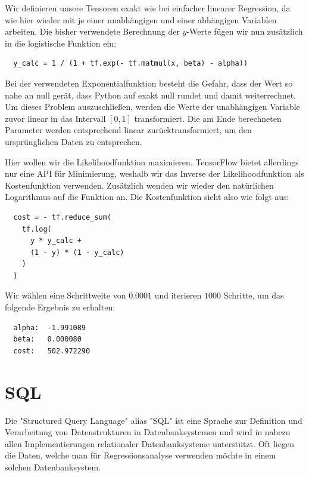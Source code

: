 Wir definieren unsere Tensoren exakt wie bei einfacher linearer Regression, da wie hier wieder mit je einer unabhängigen und einer abhängigen Variablen arbeiten. Die bisher verwendete Berechnung der $y$-Werte fügen wir nun zusätzlich in die logistische Funktion ein:

\begin{verbatim}
  y_calc = 1 / (1 + tf.exp(- tf.matmul(x, beta) - alpha))
\end{verbatim}

Bei der verwendeten Exponentialfunktion besteht die Gefahr, dass der Wert so nahe an null gerät, dass Python auf exakt null rundet und damit weiterrechnet. Um dieses Problem auszuschließen, werden die Werte der unabhängigen Variable zuvor linear in das Intervall $[0, 1]$ transformiert. Die am Ende berechneten Parameter werden entsprechend linear zurücktransformiert, um den ursprünglichen Daten zu entsprechen.

Hier wollen wir die Likelihoodfunktion maximieren. TensorFlow bietet allerdings nur eine API für Minimierung, weshalb wir das Inverse der Likelihoodfunktion als Kostenfunktion verwenden. Zusätzlich wenden wir wieder den natürlichen Logarithmus auf die Funktion an. Die Kostenfunktion sieht also wie folgt aus:

\begin{verbatim}
  cost = - tf.reduce_sum(
    tf.log(
      y * y_calc +
      (1 - y) * (1 - y_calc)
    )
  )
\end{verbatim}

Wir wählen eine Schrittweite von $0.0001$ und iterieren $1000$ Schritte, um das folgende Ergebnis zu erhalten:

\begin{verbatim}
  alpha:  -1.991089
  beta:   0.000080
  cost:   502.972290
\end{verbatim}

\section{SQL}
\label{section:3:4}

Die "Structured Query Language" alias "SQL" ist eine Sprache zur Definition und Verarbeitung von Datenstrukturen in Datenbanksystemen und wird in nahezu allen Implementierungen relationaler Datenbanksysteme unterstützt. Oft liegen die Daten, welche man für Regressionsanalyse verwenden möchte in einem solchen Datenbanksystem.

